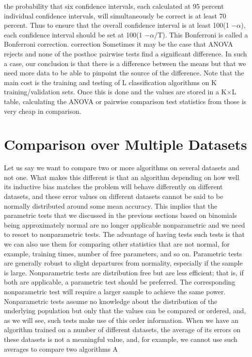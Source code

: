 the probability that six confidence intervals, each calculated at 95 percent individual confidence intervals, will simultaneously be correct is at least 70 percent. Thus to ensure that the overall confidence interval is at least 100(1 $-$$\alpha$), each confidence interval should be set at 100(1 $-$$\alpha$/T). This Bonferroni is called a Bonferroni correction. correction Sometimes it may be the case that ANOVA rejects and none of the posthoc pairwise tests find a significant difference. In such a case, our conclusion is that there is a difference between the means but that we need more data to be able to pinpoint the source of the difference. Note that the main cost is the training and testing of L classification algorithms on K training/validation sets. Once this is done and the values are stored in a K$\times$L table, calculating the ANOVA or pairwise comparison test statistics from those is very cheap in comparison.

\section{Comparison over Multiple Datasets}

Let us say we want to compare two or more algorithms on several datasets and not one. What makes this different is that an algorithm depending on how well its inductive bias matches the problem will behave differently on different datasets, and these error values on different datasets cannot be said to be normally distributed around some mean accuracy. This implies that the parametric tests that we discussed in the previous sections based on binomials being approximately normal are no longer applicable nonparametric and we need to resort to nonparametric tests. The advantage of having tests such tests is that we can also use them for comparing other statistics that are not normal, for example, training times, number of free parameters, and so on. Parametric tests are generally robust to slight departures from normality, especially if the sample is large. Nonparametric tests are distribution free but are less efficient; that is, if both are applicable, a parametric test should be preferred. The corresponding nonparametric test will require a larger sample to achieve the same power. Nonparametric tests assume no knowledge about the distribution of the underlying population but only that the values can be compared or ordered, and, as we will see, such tests make use of this order information. When we have an algorithm trained on a number of different datasets, the average of its errors on these datasets is not a meaningful value, and, for example, we cannot use such averages to compare two algorithms A

